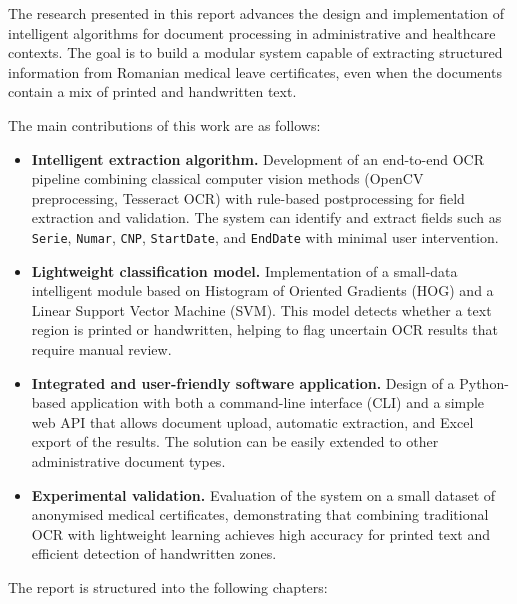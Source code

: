 \documentclass[runningheads,a4paper,11pt]{report}
\begin{document}
The research presented in this report advances the design and implementation of intelligent algorithms for document processing in administrative and healthcare contexts.
The goal is to build a modular system capable of extracting structured information from Romanian medical leave certificates, even when the documents contain a mix of printed and handwritten text.

The main contributions of this work are as follows:

\begin{itemize}
  \item \textbf{Intelligent extraction algorithm.}
  Development of an end-to-end OCR pipeline combining classical computer vision methods (OpenCV preprocessing, Tesseract OCR) with rule-based postprocessing for field extraction and validation.
  The system can identify and extract fields such as \texttt{Serie}, \texttt{Numar}, \texttt{CNP}, \texttt{StartDate}, and \texttt{EndDate} with minimal user intervention.

  \item \textbf{Lightweight classification model.}
  Implementation of a small-data intelligent module based on Histogram of Oriented Gradients (HOG) and a Linear Support Vector Machine (SVM).
  This model detects whether a text region is printed or handwritten, helping to flag uncertain OCR results that require manual review.

  \item \textbf{Integrated and user-friendly software application.}
  Design of a Python-based application with both a command-line interface (CLI) and a simple web API that allows document upload, automatic extraction, and Excel export of the results.
  The solution can be easily extended to other administrative document types.

  \item \textbf{Experimental validation.}
  Evaluation of the system on a small dataset of anonymised medical certificates, demonstrating that combining traditional OCR with lightweight learning achieves high accuracy for printed text and efficient detection of handwritten zones.
\end{itemize}

The report is structured into the following chapters:
\end{document}
